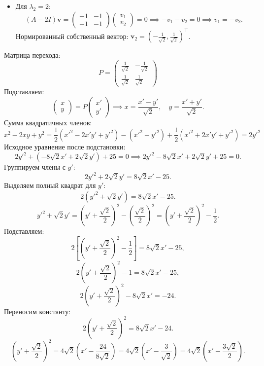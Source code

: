 \documentclass[a4paper]{article}
\begin{document}
\begin{enumerate}
\begin{enumerate}
\begin{itemize}
    \item Для \( \lambda_2 = 2 \):  
    \[
    (A - 2I)\mathbf{v} = \begin{pmatrix} -1 & -1 \\ -1 & -1 \end{pmatrix} \begin{pmatrix} v_1 \\ v_2 \end{pmatrix} = 0 \implies -v_1 - v_2 = 0 \implies v_1 = -v_2.
    \]  
    Нормированный собственный вектор: \( \mathbf{v}_2 = \left( -\frac{1}{\sqrt{2}}, \frac{1}{\sqrt{2}} \right)^\top \).  
    \end{itemize}
    Матрица перехода:  
    \[
    P = \begin{pmatrix}
    \frac{1}{\sqrt{2}} & -\frac{1}{\sqrt{2}} \\
    \frac{1}{\sqrt{2}} & \frac{1}{\sqrt{2}}
    \end{pmatrix}
    \]  
    Подставляем:  
    \[
    \begin{pmatrix} x \\ y \end{pmatrix} = P \begin{pmatrix} x' \\ y' \end{pmatrix} \implies x = \frac{x' - y'}{\sqrt{2}}, \quad y = \frac{x' + y'}{\sqrt{2}}.
    \]  
    Сумма квадратичных членов:  
    \[
    x^2 - 2xy + y^2 = \frac{1}{2}(x'^2 - 2x'y' + y'^2) - (x'^2 - y'^2) + 
    \frac{1}{2}(x'^2 + 2x'y' + y'^2) = 2y'^2
    \]  
    Исходное уравнение после подстановки:  
    \[
    2y'^2 + (-8\sqrt{2}  x' + 2\sqrt{2}  y') + 25 = 0 \implies 2y'^2 - 8\sqrt{2}  x' + 2\sqrt{2}  y' + 25 = 0.
    \]  
    Группируем члены с \( y' \):  
    \[
    2y'^2 + 2\sqrt{2}  y' = 8\sqrt{2}  x' - 25.
    \]  
    Выделяем полный квадрат для \( y' \):  
    \[
    2\left( y'^2 + \sqrt{2}  y' \right) = 8\sqrt{2}  x' - 25.
    \]  
    \[
    y'^2 + \sqrt{2}  y' = \left( y' + \frac{\sqrt{2}}{2} \right)^2 - \left( \frac{\sqrt{2}}{2} \right)^2 = \left( y' + \frac{\sqrt{2}}{2} \right)^2 - \frac{1}{2}.
    \]  
    Подставляем:  
    \[
    2\left[ \left( y' + \frac{\sqrt{2}}{2} \right)^2 - \frac{1}{2} \right] = 8\sqrt{2}  x' - 25,
    \]  
    \[
    2\left( y' + \frac{\sqrt{2}}{2} \right)^2 - 1 = 8\sqrt{2}  x' - 25,
    \]  
    \[
    2\left( y' + \frac{\sqrt{2}}{2} \right)^2 - 8\sqrt{2}  x' = -24.
    \]  
    Переносим константу:  
    \[
    2\left( y' + \frac{\sqrt{2}}{2} \right)^2 = 8\sqrt{2}  x' - 24.
    \]  
    \[
    \left( y' + \frac{\sqrt{2}}{2} \right)^2 = 4\sqrt{2} \left( x' - \frac{24}{8\sqrt{2}} \right) = 4\sqrt{2} \left( x' - \frac{3}{\sqrt{2}} \right) = 4\sqrt{2} \left( x' - \frac{3\sqrt{2}}{2} \right).
\]
\end{enumerate}
\end{enumerate}
\end{document}
